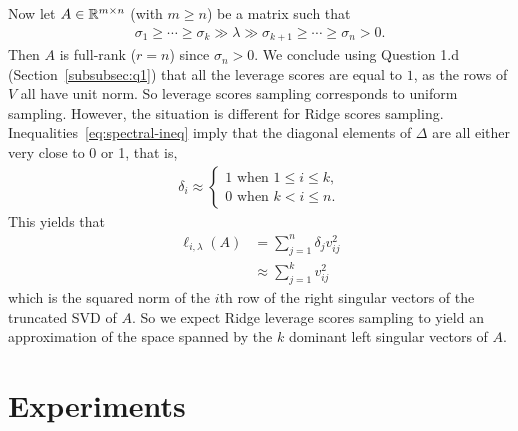 \documentclass{article}
\begin{document}
Now let $A \in {\mathbb R}^{m \times n}$ (with $m \geq n$) be a matrix such that
\begin{align}\label{eq:spectral-ineq}
  \sigma_1 \geq \cdots \geq \sigma_k \gg \lambda \gg \sigma_{k + 1} \geq \cdots \geq \sigma_n > 0.
\end{align}
Then $A$ is full-rank ($r = n$) since $\sigma_n > 0$.
We conclude using Question 1.d (Section~\ref{subsubsec:q1}) that all the
leverage scores are equal to $1$, as the rows of $V$ all have unit norm.
So leverage scores sampling corresponds to uniform sampling.
However, the situation is different for Ridge scores sampling.
Inequalities~\eqref{eq:spectral-ineq} imply that the diagonal elements of
$\Delta$ are all either very close to 0 or 1, that is,
\begin{align*}
  \delta_i \approx
  \begin{cases}
    1 \text{ when } 1 \leq i \leq k,\\
    0 \text{ when } k < i \leq n.
  \end{cases}
\end{align*}
This yields that
\begin{align*}
  \ell_{i,\lambda}(A) &= \sum_{j = 1}^n \delta_j v_{ij}^2\\
                      &\approx \sum_{j = 1}^k v_{ij}^2
\end{align*}
which is the squared norm of the $i$th row of the right singular vectors of
the truncated SVD of $A$.
So we expect Ridge leverage scores sampling to yield an approximation of the
space spanned by the $k$ dominant left singular vectors of $A$.

\section{Experiments}\label{sec:experiments}
\end{document}
